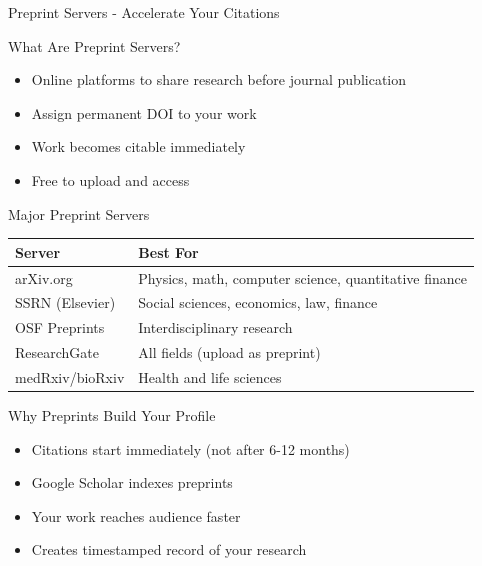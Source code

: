 \documentclass[11pt]{beamer}
\begin{document}
				\begin{frame}{Preprint Servers - Accelerate Your Citations}
					\scriptsize
					\begin{block}{What Are Preprint Servers?}
						\begin{itemize}
							\item Online platforms to share research before journal publication
							\item Assign permanent DOI to your work
							\item Work becomes citable immediately
							\item Free to upload and access
						\end{itemize}
					\end{block}
					\begin{block}{Major Preprint Servers}
						\centering
						\begin{tabular}{|p{4cm}|p{5.5cm}|}
							\hline
							\textbf{Server} & \textbf{Best For} \\
							\hline
							arXiv.org & Physics, math, computer science, quantitative finance \\
							\hline
							SSRN (Elsevier) & Social sciences, economics, law, finance \\
							\hline
							OSF Preprints & Interdisciplinary research \\
							\hline
							ResearchGate & All fields (upload as preprint) \\
							\hline
							medRxiv/bioRxiv & Health and life sciences \\
							\hline
						\end{tabular}
					\end{block}
					\begin{block}{Why Preprints Build Your Profile}
						\begin{itemize}
							\item Citations start immediately (not after 6-12 months)
							\item Google Scholar indexes preprints
							\item Your work reaches audience faster
							\item Creates timestamped record of your research
						\end{itemize}
					\end{block}
				\end{frame}
				
\end{document}
